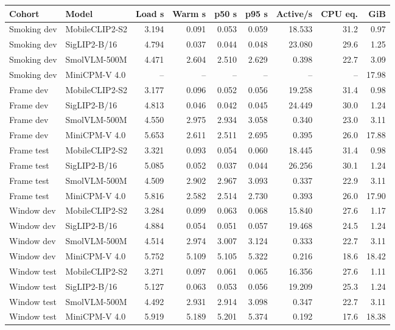 \begin{longtable}{llrrrrrrr}
\toprule
Cohort & Model & Load s & Warm s & p50 s & p95 s & Active/s & CPU eq. & GiB \\
\midrule\endhead
Smoking dev & MobileCLIP2-S2 & 3.194 & 0.091 & 0.053 & 0.059 & 18.533 & 31.2 & 0.97 \\
Smoking dev & SigLIP2-B/16 & 4.794 & 0.037 & 0.044 & 0.048 & 23.080 & 29.6 & 1.25 \\
Smoking dev & SmolVLM-500M & 4.471 & 2.604 & 2.510 & 2.629 & 0.398 & 22.7 & 3.09 \\
Smoking dev & MiniCPM-V 4.0 & -- & -- & -- & -- & -- & -- & 17.98 \\
Frame dev & MobileCLIP2-S2 & 3.177 & 0.096 & 0.052 & 0.056 & 19.258 & 31.4 & 0.98 \\
Frame dev & SigLIP2-B/16 & 4.813 & 0.046 & 0.042 & 0.045 & 24.449 & 30.0 & 1.24 \\
Frame dev & SmolVLM-500M & 4.550 & 2.975 & 2.934 & 3.058 & 0.340 & 23.0 & 3.11 \\
Frame dev & MiniCPM-V 4.0 & 5.653 & 2.611 & 2.511 & 2.695 & 0.395 & 26.0 & 17.88 \\
Frame test & MobileCLIP2-S2 & 3.321 & 0.093 & 0.054 & 0.060 & 18.445 & 31.4 & 0.98 \\
Frame test & SigLIP2-B/16 & 5.085 & 0.052 & 0.037 & 0.044 & 26.256 & 30.1 & 1.24 \\
Frame test & SmolVLM-500M & 4.509 & 2.902 & 2.967 & 3.093 & 0.337 & 22.9 & 3.11 \\
Frame test & MiniCPM-V 4.0 & 5.816 & 2.582 & 2.514 & 2.730 & 0.393 & 26.0 & 17.90 \\
Window dev & MobileCLIP2-S2 & 3.284 & 0.099 & 0.063 & 0.068 & 15.840 & 27.6 & 1.17 \\
Window dev & SigLIP2-B/16 & 4.884 & 0.054 & 0.051 & 0.057 & 19.468 & 24.5 & 1.24 \\
Window dev & SmolVLM-500M & 4.514 & 2.974 & 3.007 & 3.124 & 0.333 & 22.7 & 3.11 \\
Window dev & MiniCPM-V 4.0 & 5.752 & 5.109 & 5.105 & 5.322 & 0.216 & 18.6 & 18.42 \\
Window test & MobileCLIP2-S2 & 3.271 & 0.097 & 0.061 & 0.065 & 16.356 & 27.6 & 1.11 \\
Window test & SigLIP2-B/16 & 5.127 & 0.063 & 0.053 & 0.056 & 19.209 & 25.3 & 1.24 \\
Window test & SmolVLM-500M & 4.492 & 2.931 & 2.914 & 3.098 & 0.347 & 22.7 & 3.11 \\
Window test & MiniCPM-V 4.0 & 5.919 & 5.189 & 5.201 & 5.374 & 0.192 & 17.6 & 18.38 \\
\bottomrule
\end{longtable}
